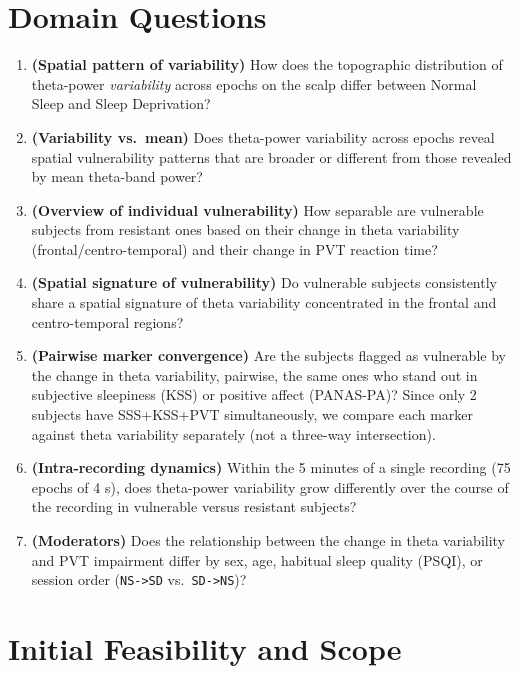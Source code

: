 \documentclass[10pt]{article}
\begin{document}
\section{Domain Questions}
\begin{enumerate}[leftmargin=2.2em, label=\textbf{Q\arabic*.}, ref=Q\arabic*]
    \item \textbf{(Spatial pattern of variability)} How does the topographic distribution of theta-power \emph{variability} across epochs on the scalp differ between Normal Sleep and Sleep Deprivation?
    \item \textbf{(Variability vs.\ mean)} Does theta-power variability across epochs reveal spatial vulnerability patterns that are broader or different from those revealed by mean theta-band power?
    \item \textbf{(Overview of individual vulnerability)} How separable are vulnerable subjects from resistant ones based on their change in theta variability (frontal/centro-temporal) and their change in PVT reaction time?
    \item \textbf{(Spatial signature of vulnerability)} Do vulnerable subjects consistently share a spatial signature of theta variability concentrated in the frontal and centro-temporal regions?
    \item \textbf{(Pairwise marker convergence)} Are the subjects flagged as vulnerable by the change in theta variability, pairwise, the same ones who stand out in subjective sleepiness (KSS) or positive affect (PANAS-PA)? Since only 2 subjects have SSS+KSS+PVT simultaneously, we compare each marker against theta variability separately (not a three-way intersection).
    \item \textbf{(Intra-recording dynamics)} Within the 5 minutes of a single recording (75 epochs of 4 s), does theta-power variability grow differently over the course of the recording in vulnerable versus resistant subjects?
    \item \textbf{(Moderators)} Does the relationship between the change in theta variability and PVT impairment differ by sex, age, habitual sleep quality (PSQI), or session order (\texttt{NS->SD} vs.\ \texttt{SD->NS})?
\end{enumerate}

\section{Initial Feasibility and Scope}
\end{document}
